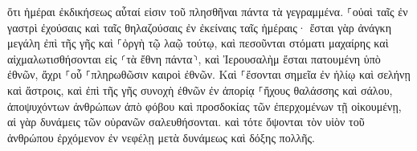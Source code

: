 \documentclass{openreader}
\begin{document}
ὅτι ἡμέραι ἐκδικήσεως αὗταί εἰσιν τοῦ πλησθῆναι πάντα τὰ γεγραμμένα. 
⸀οὐαὶ ταῖς ἐν γαστρὶ ἐχούσαις καὶ ταῖς θηλαζούσαις ἐν ἐκείναις ταῖς ἡμέραις· ἔσται γὰρ ἀνάγκη μεγάλη ἐπὶ τῆς γῆς καὶ ⸀ὀργὴ τῷ λαῷ τούτῳ, 
καὶ πεσοῦνται στόματι μαχαίρης καὶ αἰχμαλωτισθήσονται εἰς ⸂τὰ ἔθνη πάντα⸃, καὶ Ἰερουσαλὴμ ἔσται πατουμένη ὑπὸ ἐθνῶν, ἄχρι ⸀οὗ ⸀πληρωθῶσιν καιροὶ ἐθνῶν. 
Καὶ ⸀ἔσονται σημεῖα ἐν ἡλίῳ καὶ σελήνῃ καὶ ἄστροις, καὶ ἐπὶ τῆς γῆς συνοχὴ ἐθνῶν ἐν ἀπορίᾳ ⸀ἤχους θαλάσσης καὶ σάλου, 
ἀποψυχόντων ἀνθρώπων ἀπὸ φόβου καὶ προσδοκίας τῶν ἐπερχομένων τῇ οἰκουμένῃ, αἱ γὰρ δυνάμεις τῶν οὐρανῶν σαλευθήσονται. 
καὶ τότε ὄψονται τὸν υἱὸν τοῦ ἀνθρώπου ἐρχόμενον ἐν νεφέλῃ μετὰ δυνάμεως καὶ δόξης πολλῆς. 
\end{document}
